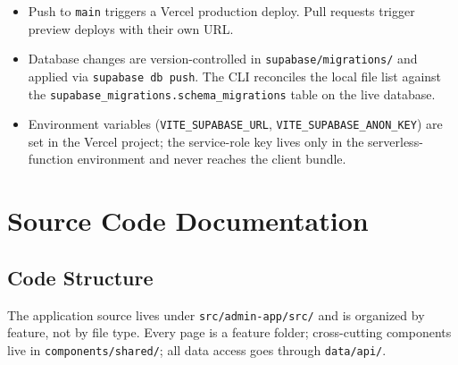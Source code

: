 \documentclass[11pt,letterpaper]{article}
\begin{document}
\begin{itemize}[noitemsep]
  \item Push to \texttt{main} triggers a Vercel production
        deploy. Pull requests trigger preview deploys with their
        own URL.
  \item Database changes are version-controlled in
        \texttt{supabase/migrations/} and applied via
        \texttt{supabase db push}. The CLI reconciles the local
        file list against the
        \texttt{supabase\_migrations.schema\_migrations} table on
        the live database.
  \item Environment variables (\texttt{VITE\_SUPABASE\_URL},
        \texttt{VITE\_SUPABASE\_ANON\_KEY}) are set in the Vercel
        project; the service-role key lives only in the
        serverless-function environment and never reaches the
        client bundle.
\end{itemize}

\newpage

\section{Source Code Documentation}

\subsection{Code Structure}

The application source lives under \texttt{src/admin-app/src/} and
is organized by feature, not by file type. Every page is a feature
folder; cross-cutting components live in \texttt{components/shared/};
all data access goes through \texttt{data/api/}.
\end{document}
